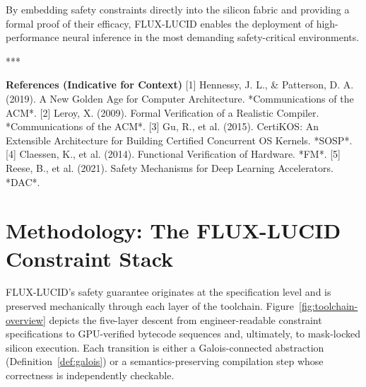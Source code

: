 \documentclass[sigplan,review,anonymous]{acmart}
\begin{document}
By embedding safety constraints directly into the silicon fabric and providing a formal proof of their efficacy, FLUX-LUCID enables the deployment of high-performance neural inference in the most demanding safety-critical environments.

***

\textbf{References (Indicative for Context)}
[1] Hennessy, J. L., & Patterson, D. A. (2019). A New Golden Age for Computer Architecture. *Communications of the ACM*.
[2] Leroy, X. (2009). Formal Verification of a Realistic Compiler. *Communications of the ACM*.
[3] Gu, R., et al. (2015). CertiKOS: An Extensible Architecture for Building Certified Concurrent OS Kernels. *SOSP*.
[4] Claessen, K., et al. (2014). Functional Verification of Hardware. *FM*.
[5] Reese, B., et al. (2021). Safety Mechanisms for Deep Learning Accelerators. *DAC*.


\section{Methodology: The FLUX-LUCID Constraint Stack}
\label{sec:methodology}

FLUX-LUCID's safety guarantee originates at the specification level and is
preserved mechanically through each layer of the toolchain.
Figure~\ref{fig:toolchain-overview} depicts the five-layer descent from
engineer-readable constraint specifications to GPU-verified bytecode
sequences and, ultimately, to mask-locked silicon execution.
Each transition is either a Galois-connected abstraction (Definition~\ref{def:galois})
or a semantics-preserving compilation step whose correctness is independently
checkable.
\end{document}
